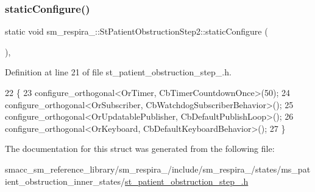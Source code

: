 \subsubsection{\texorpdfstring{static\+Configure()}{staticConfigure()}}
{\footnotesize\ttfamily static void sm\+\_\+respira\+\_\+::\+St\+Patient\+Obstruction\+Step2\+::static\+Configure (\begin{DoxyParamCaption}{ }\end{DoxyParamCaption})\hspace{0.3cm}{\ttfamily [inline]}, {\ttfamily [static]}}



Definition at line 21 of file st\+\_\+patient\+\_\+obstruction\+\_\+step\+\_.\+h.


\begin{DoxyCode}
22     \{
23         configure\_orthogonal<OrTimer, CbTimerCountdownOnce>(50);
24         configure\_orthogonal<OrSubscriber, CbWatchdogSubscriberBehavior>();
25         configure\_orthogonal<OrUpdatablePublisher, CbDefaultPublishLoop>();
26         configure\_orthogonal<OrKeyboard, CbDefaultKeyboardBehavior>();
27     \}
\end{DoxyCode}


The documentation for this struct was generated from the following file\+:\begin{DoxyCompactItemize}
\item 
smacc\+\_\+sm\+\_\+reference\+\_\+library/sm\+\_\+respira\+\_/include/sm\+\_\+respira\+\_/states/ms\+\_\+patient\+\_\+obstruction\+\_\+inner\+\_\+states/\hyperlink{st__patient__obstruction__step__2_8h}{st\+\_\+patient\+\_\+obstruction\+\_\+step\+\_.\+h}\end{DoxyCompactItemize}
